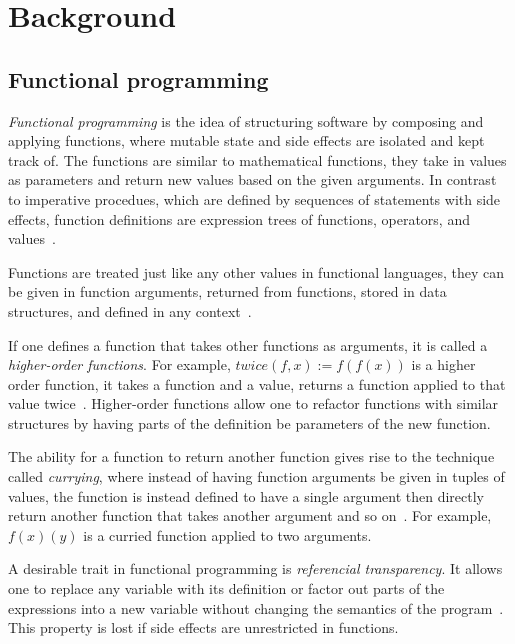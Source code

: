 \chapter{Background}\label{ch:background}

\section{Functional programming}

\emph{Functional programming} is the idea of structuring software by
composing and applying functions, where mutable state and side effects are
isolated and kept track of. The functions are similar to mathematical functions,
they take in values as parameters and return new values based on the given
arguments. In contrast to imperative procedues, which are defined by sequences
of statements with side effects, function definitions are expression trees of
functions, operators, and values~\cite{functional-Hudak, functional-Hughes}.

Functions are treated just like any other values in functional languages, they
can be given in function arguments, returned from functions, stored in data
structures, and defined in any context~\cite{functional-Hudak, sicp}.

If one defines a function that takes other functions as arguments, it is called
a \emph{higher-order functions}. For example, \( \mathit{twice}(f, x) := f(f(x))
\) is a higher order function, it takes a function and a value, returns a
function applied to that value twice~\cite{functional-Hudak}. Higher-order
functions allow one to refactor functions with similar structures by having
parts of the definition be parameters of the new function.

The ability for a function to return another function gives rise to the
technique called \emph{currying}, where instead of having function arguments
be given in tuples of values, the function is instead defined to have a single
argument then directly return another function that takes another argument and
so on~\cite{functional-Hudak, lambda-Barendregt}. For example, \( f(x)(y) \)
is a curried function applied to two arguments.

A desirable trait in functional programming is \emph{referencial transparency}.
It allows one to replace any variable with its definition or factor out parts of
the expressions into a new variable without changing the semantics of the
program~\cite{functional-Hudak, functional-Hughes}. This property is lost if
side effects are unrestricted in functions.

